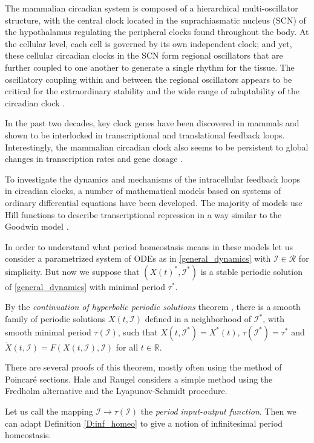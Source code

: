 \documentclass[a4paper,fleqn]{cas-dc}
\newcommand{\II}{{\mathcal I}}
\begin{document}
The mammalian circadian system is composed of a hierarchical multi-oscillator structure, with the central clock located in the suprachiasmatic nucleus (SCN) of the hypothalamus regulating the peripheral clocks found throughout the body. 
At the cellular level, each cell is governed by its own independent clock; and yet, these cellular circadian clocks in the SCN form regional oscillators that are further coupled to one another to generate a single rhythm for the tissue. 
The oscillatory coupling within and between the regional oscillators appears to be critical for the extraordinary stability and the wide range of adaptability of the circadian clock \cite{dibner2010}.

In the past two decades, key clock genes have been discovered in mammals and shown to be interlocked in transcriptional and translational feedback loops.
Interestingly, the mammalian circadian clock also seems to be persistent to global changes in transcription rates and gene dosage \cite{dibner2009}.

To investigate the dynamics and mechanisms of
the intracellular feedback loops in circadian clocks, a number of mathematical models based on systems of ordinary differential equations have been developed. 
The majority of models use Hill functions to describe transcriptional repression in a way similar to the Goodwin model \cite{kim2016}.

In order to understand what period homeostasis means in these models let us consider a parametrized system of ODEs as in \ref{general_dynamics} with $\II\in\mathcal{R}$ for simplicity.
But now we suppose that $(X(t)^*,\II^*)$ is a stable periodic solution of \eqref{general_dynamics} with minimal period $\tau^*$.

By the \emph{continuation of hyperbolic periodic solutions} theorem \cite[Thm. 1.1]{hale2013}, there is a smooth family of periodic solutions $X(t,\II)$ defined in a neighborhood of $\II^*$, with smooth minimal period $\tau(\II)$, such that $X(t,\II^*) = X^*(t)$, $\tau(\II^*)=\tau^*$ and $\dot{X}(t,\II) = F(X(t,\II),\II)$ for all $t\in\mathbb{R}$. 

There are several proofs of this theorem, mostly often using the method of Poincar\'e sections. 
Hale and Raugel \cite{hale2013} considers a simple method using the Fredholm alternative and the Lyapunov-Schmidt procedure.

Let us call the mapping $\II\to\tau(\II)$ the \emph{period input-output function}.
Then we can adapt Definition \ref{D:inf_homeo} to give a notion of infinitesimal period homeostasis.
\end{document}
